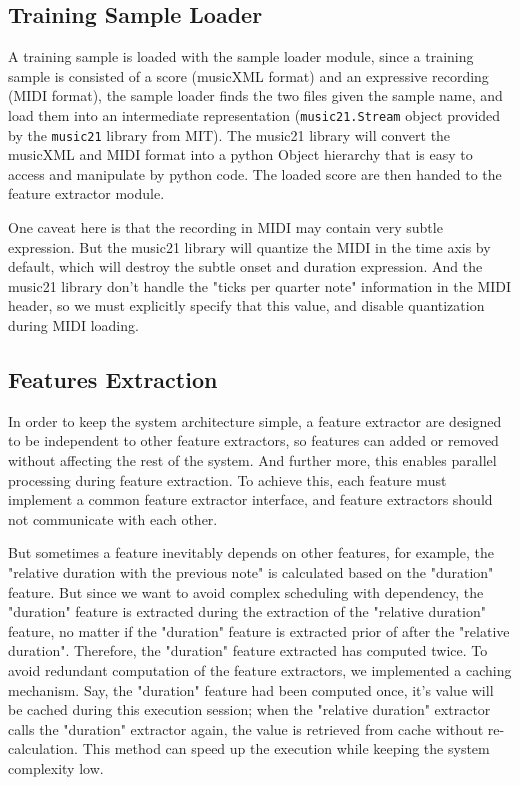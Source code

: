 
\subsection{Training Sample Loader}
   A training sample is loaded with the sample loader module, since a training sample is consisted of a score (musicXML format) and an expressive recording (MIDI format), the sample loader finds the two files given the sample name, and load them into an intermediate representation (\texttt{music21.Stream} object provided by the \texttt{music21} library\cite{music21} from MIT). The music21 library will convert the musicXML and MIDI format into a python Object hierarchy that is easy to access and manipulate by python code. The loaded score are then handed to the feature extractor module. 

One caveat here is that the recording in MIDI may contain very subtle expression. But the music21 library will quantize the MIDI in the time axis by default, which will destroy the subtle onset and duration expression. And the music21 library don't handle the "ticks per quarter note" information in the MIDI header\cite{midispec}, so we must explicitly specify that this value, and disable quantization during MIDI loading.

\subsection{Features Extraction}
   In  order to keep the system architecture simple, a feature extractor are designed to be independent to other feature extractors, so features can added or removed without affecting the rest of the system. And further more, this enables parallel processing during feature extraction. To achieve this, each feature must implement a common feature extractor interface, and feature extractors should not communicate with each other. 

   But sometimes a feature inevitably depends on other features, for example, the "relative duration with the previous note" is calculated based on the "duration" feature. But since we want to avoid complex scheduling with dependency, the "duration" feature is extracted during the extraction of the "relative duration" feature, no matter if the "duration" feature is extracted prior of after the "relative duration". Therefore, the "duration" feature extracted has computed twice. To avoid redundant computation of the feature extractors, we implemented a caching mechanism. Say, the "duration" feature had been computed once, it's value will be cached during this execution session; when the "relative duration" extractor calls the "duration" extractor again, the value is retrieved from cache without re-calculation. This method can speed up the execution while keeping the system complexity low.

